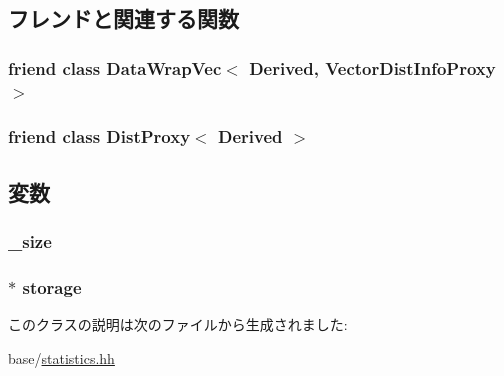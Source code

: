 \subsection{フレンドと関連する関数}
\hypertarget{classStats_1_1VectorDistBase_a7b8537e9160298dae198519c7f6aafa7}{
\subsubsection[{DataWrapVec$<$ Derived, VectorDistInfoProxy $>$}]{\setlength{\rightskip}{0pt plus 5cm}friend class {\bf DataWrapVec}$<$ Derived, {\bf VectorDistInfoProxy} $>$}}
\label{classStats_1_1VectorDistBase_a7b8537e9160298dae198519c7f6aafa7}
\hypertarget{classStats_1_1VectorDistBase_ae4e3b17825b3cd119a56463a20e17192}{
\subsubsection[{DistProxy$<$ Derived $>$}]{\setlength{\rightskip}{0pt plus 5cm}friend class {\bf DistProxy}$<$ Derived $>$}}
\label{classStats_1_1VectorDistBase_ae4e3b17825b3cd119a56463a20e17192}


\subsection{変数}
\hypertarget{classStats_1_1VectorDistBase_a9f1927ae81f20205d93e0b86915f27d7}{
\subsubsection[{\_\-size}]{ {\bf \_\-size}}}
\label{classStats_1_1VectorDistBase_a9f1927ae81f20205d93e0b86915f27d7}
\hypertarget{classStats_1_1VectorDistBase_a1b410f65a3077609e9b1902c52136304}{
\subsubsection[{storage}]{$\ast$ {\bf storage}}}
\label{classStats_1_1VectorDistBase_a1b410f65a3077609e9b1902c52136304}


このクラスの説明は次のファイルから生成されました:\begin{DoxyCompactItemize}
\item 
base/\hyperlink{statistics_8hh}{statistics.hh}\end{DoxyCompactItemize}
